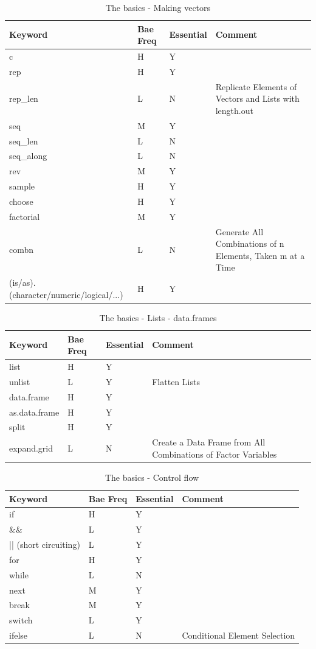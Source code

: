 \documentclass[11pt,]{krantz}
\theoremstyle{definition}
\theoremstyle{definition}
\theoremstyle{remark}
\begin{document}
\begin{longtable}[t]{llll}
\caption{\label{tab:knitchunk8}The basics - Making vectors }\\
\toprule
Keyword & Bae Freq & Essential & Comment\\
\midrule
c & H & Y & \\
rep & H & Y & \\
rep\_len & L & N & Replicate Elements of Vectors and Lists with length.out\\
seq & M & Y & \\
seq\_len & L & N & \\
\addlinespace
seq\_along & L & N & \\
rev & M & Y & \\
sample & H & Y & \\
choose & H & Y & \\
factorial & M & Y & \\
\addlinespace
combn & L & N & Generate All Combinations of n Elements, Taken m at a Time\\
(is/as).(character/numeric/logical/...) & H & Y & \\
\bottomrule
\end{longtable}

\begin{longtable}[t]{llll}
\caption{\label{tab:knitchunk9}The basics - Lists - data.frames }\\
\toprule
Keyword & Bae Freq & Essential & Comment\\
\midrule
list & H & Y & \\
unlist & L & Y & Flatten Lists\\
data.frame & H & Y & \\
as.data.frame & H & Y & \\
split & H & Y & \\
expand.grid & L & N & Create a Data Frame from All Combinations of Factor Variables\\
\bottomrule
\end{longtable}

\begin{longtable}[t]{llll}
\caption{\label{tab:knitchunk10}The basics - Control flow }\\
\toprule
Keyword & Bae Freq & Essential & Comment\\
\midrule
if & H & Y & \\
\&\& & L & Y & \\
|| (short circuiting) & L & Y & \\
for & H & Y & \\
while & L & N & \\
\addlinespace
next & M & Y & \\
break & M & Y & \\
switch & L & Y & \\
ifelse & L & N & Conditional Element Selection\\
\bottomrule
\end{longtable}
\end{document}
